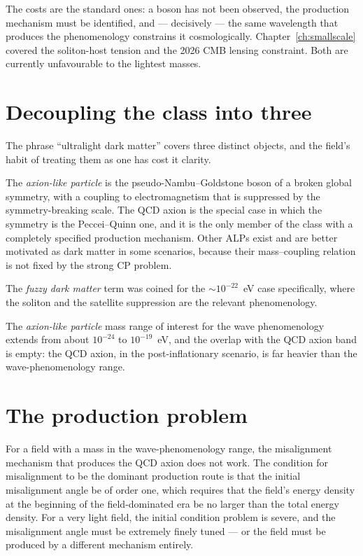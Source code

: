 The costs are the standard ones: a boson has not been observed, the
production mechanism must be identified, and --- decisively --- the same
wavelength that produces the phenomenology constrains it cosmologically.
Chapter~\ref{ch:smallscale} covered the soliton-host tension and the 2026
CMB lensing constraint. Both are currently unfavourable to the lightest
masses.

\section{Decoupling the class into three}The phrase ``ultralight dark matter'' covers three
distinct objects, and the field's habit of treating them as one has cost it
clarity.

The \emph{axion-like particle} is the pseudo-Nambu--Goldstone boson of a
broken global symmetry, with a coupling to electromagnetism that is
suppressed by the symmetry-breaking scale. The QCD axion is the special
case in which the symmetry is the Peccei--Quinn one, and it is the only
member of the class with a completely specified production mechanism. Other
ALPs exist and are better motivated as dark matter in some scenarios, because
their mass--coupling relation is not fixed by the strong CP problem.

The \emph{fuzzy dark matter} term was coined for the $\sim 10^{-22}$~eV
case specifically, where the soliton and the satellite suppression are the
relevant phenomenology.

The \emph{axion-like particle} mass range of interest for the wave
phenomenology extends from about $10^{-24}$ to $10^{-19}$~eV, and the
overlap with the QCD axion band is empty: the QCD axion, in the
post-inflationary scenario, is far heavier than the wave-phenomenology
range.

\section{The production problem}For a field with a mass in the wave-phenomenology range, the
misalignment mechanism that produces the QCD axion does not work. The
condition for misalignment to be the dominant production route is that the
initial misalignment angle be of order one, which requires that the field's
energy density at the beginning of the field-dominated era be no larger than
the total energy density. For a very light field, the initial condition
problem is severe, and the misalignment angle must be extremely finely
tuned --- or the field must be produced by a different mechanism entirely.

